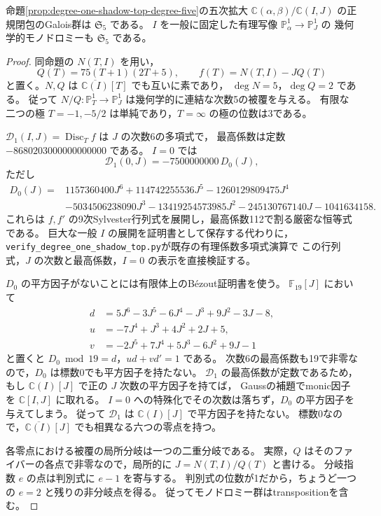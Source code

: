 \begin{proposition}[最高活性五次写像の幾何学的モノドロミー]
\label{prop:degree-one-top-monodromy-s5}
命題\ref{prop:degree-one-shadow-top-degree-five}の五次拡大
$\mathbb C(\alpha,\beta)/\mathbb C(I,J)$ の正規閉包のGalois群は $\mathfrak S_5$ である。
$I$ を一般に固定した有理写像 $\mathbb P^1_\alpha\to\mathbb P^1_J$ の
幾何学的モノドロミーも $\mathfrak S_5$ である。
\end{proposition}
\begin{proof}
同命題の $N(T,I)$ を用い，
\[
 Q(T)=75(T+1)(2T+5),\qquad f(T)=N(T,I)-JQ(T)
\]
と置く。$N,Q$ は $\overline{\mathbb C(I)}[T]$ でも互いに素であり，
$\deg N=5$，$\deg Q=2$ である。
従って $N/Q:\mathbb P^1_T\to\mathbb P^1_J$ は幾何学的に連結な次数5の被覆を与える。
有限な二つの極 $T=-1,-5/2$ は単純であり，$T=\infty$ の極の位数は3である。

$\mathscr D_1(I,J)=\operatorname{Disc}_T f$ は $J$ の次数6の多項式で，
最高係数は定数 $-8680203000000000000$ である。
$I=0$ では
\[
 \mathscr D_1(0,J)=-7500000000\,D_0(J),
\]
ただし
\begin{align*}
 D_0(J)={}&1157360400J^6+114742255536J^5
       -1260129809475J^4\\
 &-5034506238090J^3-13419254573985J^2
       -245130767140J-1041634158.
\end{align*}
これらは $f,f'$ の9次Sylvester行列式を展開し，最高係数112で割る厳密な恒等式である。
巨大な一般 $I$ の展開を証明書として保存する代わりに，
\texttt{verify\_degree\_one\_shadow\_top.py}が既存の有理係数多項式演算で
この行列式，$J$ の次数と最高係数，$I=0$ の表示を直接検証する。

$D_0$ の平方因子がないことには有限体上のB\'ezout証明書を使う。
$\mathbb F_{19}[J]$ において
\begin{align*}
 d&=5J^6-3J^5-6J^4-J^3+9J^2-3J-8,\\
 u&=-7J^4+J^3+4J^2+2J+5,\\
 v&=-2J^5+7J^4+5J^3-6J^2+9J-1
\end{align*}
と置くと $D_0\bmod19=d$，$ud+vd'=1$ である。
次数6の最高係数も19で非零なので，$D_0$ は標数0でも平方因子を持たない。
$\mathscr D_1$ の最高係数が定数であるため，もし
$\mathbb C(I)[J]$ で正の $J$ 次数の平方因子を持てば，
Gaussの補題でmonic因子を $\mathbb C[I,J]$ に取れる。
$I=0$ への特殊化でその次数は落ちず，$D_0$ の平方因子を与えてしまう。
従って $\mathscr D_1$ は $\mathbb C(I)[J]$ で平方因子を持たない。
標数0なので，$\overline{\mathbb C(I)}[J]$ でも相異なる六つの零点を持つ。

各零点における被覆の局所分岐は一つの二重分岐である。
実際，$Q$ はそのファイバーの各点で非零なので，局所的に $J=N(T,I)/Q(T)$ と書ける。
分岐指数 $e$ の点は判別式に $e-1$ を寄与する。
判別式の位数が1だから，ちょうど一つの $e=2$ と残りの非分岐点を得る。
従ってモノドロミー群はtranspositionを含む。


\end{proof}
